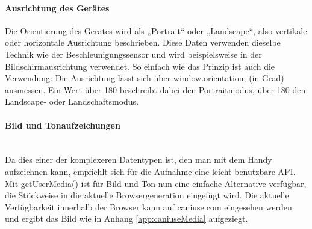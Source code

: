 \documentclass[a4paper]{spie}  %
\begin{document}
\paragraph{Ausrichtung des Gerätes}
Die Orientierung des Gerätes wird als „Portrait“ oder „Landscape“, also vertikale oder horizontale Ausrichtung beschrieben. Diese Daten verwenden dieselbe Technik wie der Beschleunigungssensor und wird beispielsweise in der Bildschirmausrichtung verwendet. So einfach wie das Prinzip ist auch die Verwendung: Die Ausrichtung lässt sich über window.orientation; (in Grad) ausmessen. Ein Wert über 180 beschreibt dabei den Portraitmodus, über 180 den Landscape- oder Landschaftsmodus.

\vspace{0pt}
\paragraph{Bild und Tonaufzeichungen}\mbox{}\\
Da dies einer der komplexeren Datentypen ist, den man mit dem Handy aufzeichnen kann, empfiehlt sich für die Aufnahme eine leicht benutzbare API. Mit getUserMedia() ist für Bild und Ton nun eine einfache Alternative verfügbar, die Stückweise in die aktuelle Browsergeneration eingefügt wird. Die aktuelle Verfügbarkeit innerhalb der Browser kann auf caniuse.com eingesehen werden und ergibt das Bild wie in Anhang \ref{app:caniuseMedia} aufgeziegt.


\end{document}
